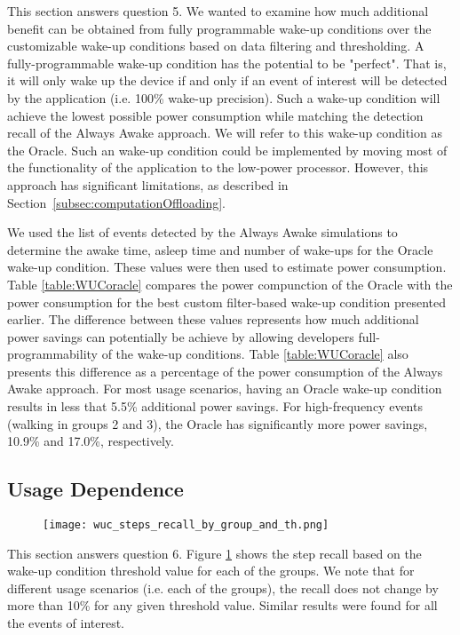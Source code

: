 This section answers question 5. We wanted to examine how much additional benefit can be obtained from fully programmable wake-up conditions over the customizable wake-up conditions based on data filtering and thresholding. A fully-programmable wake-up condition has the potential to be "perfect". That is, it will only wake up the device if and only if an event of interest will be detected by the application (i.e. 100\% wake-up precision). Such a wake-up condition will achieve the lowest possible power consumption while matching the detection recall of the Always Awake approach. We will refer to this wake-up condition as the Oracle. Such an wake-up condition could be implemented by moving most of the functionality of the application to the low-power processor. However, this approach has significant limitations, as described in Section~\ref{subsec:computationOffloading}.

We used the list of events detected by the Always Awake simulations to determine the awake time, asleep time and number of wake-ups for the Oracle wake-up condition. These values were then used to estimate power consumption. Table \ref{table:WUCoracle} compares the power compunction of the Oracle with the power consumption for the best custom filter-based wake-up condition presented earlier. The difference between these values represents how much additional power savings can potentially be achieve by allowing developers full-programmability of the wake-up conditions. Table \ref{table:WUCoracle} also presents this difference as a percentage of the power consumption of the Always Awake approach. For most usage scenarios, having an Oracle wake-up condition results in less that 5.5\% additional power savings. For high-frequency events (walking in groups 2 and 3), the Oracle has significantly more power savings, 10.9\% and 17.0\%, respectively.

\iffalse
\subsection{Usage Dependence}

\begin{figure}[h]
	\texttt{[image: wuc\_steps\_recall\_by\_group\_and\_th.png]}
	\caption{}
    \label{fig:wucStepsRecallByGroupAndThreshold}
\end{figure}

This section answers question 6. Figure \ref{fig:wucStepsRecallByGroupAndThreshold} shows the step recall based on the wake-up condition threshold value for each of the groups. We note that for different usage scenarios (i.e. each of the groups), the recall does not change by more than 10\% for any given threshold value. Similar results were found for all the events of interest. 

